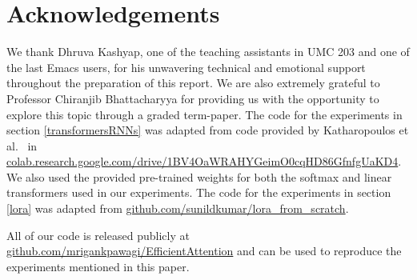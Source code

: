 \documentclass{article}
\begin{document}
\section{Acknowledgements}
We thank Dhruva Kashyap, one of the teaching assistants in UMC 203 and one of the last Emacs users, for his unwavering technical and emotional support throughout the preparation of this report. We are also extremely grateful to Professor Chiranjib Bhattacharyya for providing us with the opportunity to explore this topic through a graded term-paper. The code for the experiments in section \ref{transformersRNNs} was adapted from code provided by Katharopoulos et al.~\cite{transformersRNN} in \hyperlink{https://colab.research.google.com/drive/1BV4OaWRAHYGeimO0cqHD86GfnfgUaKD4}{colab.research.google.com/drive/1BV4OaWRAHYGeimO0cqHD86GfnfgUaKD4}. We also used the provided pre-trained weights for both the softmax and linear transformers used in our experiments. The code for the experiments in section \ref{lora} was adapted from \hyperlink{https://github.com/sunildkumar/lora_from_scratch/blob/main/lora_on_mnist.ipynb}{github.com/sunildkumar/lora\_from\_scratch}.

All of our code is released publicly at \hyperlink{https://github.com/mrigankpawagi/EfficientAttention}{github.com/mrigankpawagi/EfficientAttention} and can be used to reproduce the experiments mentioned in this paper.

\end{document}
